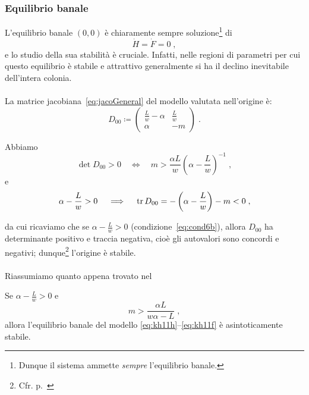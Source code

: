 \subsubsection{Equilibrio banale}
L'equilibrio banale $(0,0)$ è chiaramente sempre soluzione\footnote{Dunque il sistema ammette
\emph{sempre} l'equilibrio banale.}
di $$\dot{H}=\dot{F}=0 \; ,$$ e lo studio della sua stabilità è cruciale.
Infatti, nelle regioni di parametri per cui questo equilibrio è stabile e attrattivo generalmente si ha il declino
inevitabile dell'intera colonia.

\paragraph{}
La matrice jacobiana~\eqref{eq:jacoGeneral} del modello valutata nell'origine è:
\begin{equation}
    D_{00} \coloneq
    \begin{pmatrix}
        \frac{L}{w} -\alpha &
        \frac{L}{w}
        \\
        \alpha & -m
    \end{pmatrix} \; .
    \label{eq:jacoEquZero}
\end{equation}


Abbiamo
$$\det  D_{00} > 0 \quad \iff \quad
m > \frac{\alpha L}{w} {\left( \alpha - \frac{L}{w} \right)}^{-1} \; ,$$
e
$$ \alpha - \frac{L}{w} > 0  \quad \implies \quad
\operatorname{tr} D_{00} = - \left( \alpha - \frac{L}{w} \right) - m < 0 \; ,$$

da cui ricaviamo che se $\alpha -\frac{L}{w}>0$ (condizione~\eqref{eq:cond6b}), allora $D_{00}$ ha
determinante positivo e traccia negativa, cioè gli autovalori sono concordi e negativi;
dunque\footnote{Cfr. p.~\pageref{teo:pozzoNonLineare}} l'origine è stabile.

\paragraph{}
Riassumiamo quanto appena trovato nel
\begin{lemma}
    Se $\alpha - \frac{L}{w} > 0$ e
    $$m > \frac{\alpha L}{w \alpha -L} \; ,$$
    allora l'equilibrio banale del modello \eqref{eq:kh11h}--\eqref{eq:kh11f} è asintoticamente stabile.
\end{lemma}


